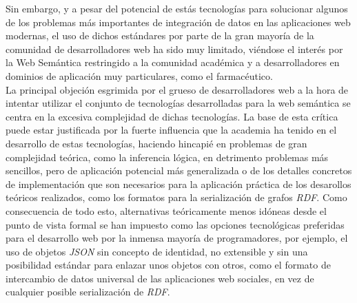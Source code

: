 Sin embargo, y a pesar del potencial de est\'as tecnolog\'ias para solucionar algunos de los problemas m\'as importantes de integraci\'on de datos en las aplicaciones web modernas, el uso de dichos est\'andares por parte de la gran mayor\'ia de la comunidad de desarrolladores web ha sido muy limitado, vi\'endose el inter\'es por la Web Sem\'antica restringido a la comunidad acad\'emica y a desarrolladores en dominios de aplicaci\'on muy particulares, como el farmac\'eutico.\\
La principal objeci\'on esgrimida por el grueso de desarrolladores web a la hora de intentar utilizar el conjunto de tecnolog\'ias desarrolladas para la web sem\'antica se centra en la excesiva complejidad de dichas tecnolog\'ias. La base de esta cr\'itica puede estar justificada por la fuerte influencia que la academia ha tenido en el desarrollo de estas tecnolog\'ias, haciendo hincapi\'e en problemas de gran complejidad te\'orica, como la inferencia l\'ogica, en detrimento problemas m\'as sencillos, pero de aplicaci\'on potencial m\'as generalizada o de los detalles concretos de implementaci\'on que son necesarios para la aplicaci\'on pr\'actica de los desarollos te\'oricos realizados, como los formatos para la serializaci\'on de grafos {\it RDF}. 
Como consecuencia de todo esto, alternativas te\'oricamente menos id\'oneas desde el punto de vista formal se han impuesto como las opciones tecnol\'ogicas preferidas para el desarrollo web por la inmensa mayor\'ia de programadores, por ejemplo, el uso de objetos {\it JSON} \cite{json} sin concepto de identidad, no extensible y sin una posibilidad est\'andar para enlazar unos objetos con otros, como el formato de intercambio de datos universal de las aplicaciones web sociales, en vez de cualquier posible serializaci\'on de {\it RDF}.\\


